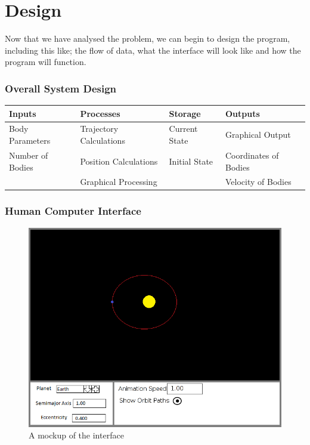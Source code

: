 \part{Design}

Now that we have analysed the problem, we can begin to design the program,
including this like; the flow of data, what the interface will look like and how
the program will function.

\section{Overall System Design}

\begin{tabular}{llll}
	Inputs & Processes & Storage & Outputs \\ \hline
	Body Parameters & Trajectory Calculations 
		& Current State & Graphical Output \\
	Number of Bodies & Position Calculations 
		& Initial State & Coordinates of Bodies \\ 
	& Graphical Processing && Velocity of Bodies \\
\end{tabular}

\section{Human Computer Interface}

\begin{figure}[h!]
	\includegraphics[width=\textwidth]{./img/interface.png}
	\caption{A mockup of the interface}
	\label{fig:hci}
\end{figure}

